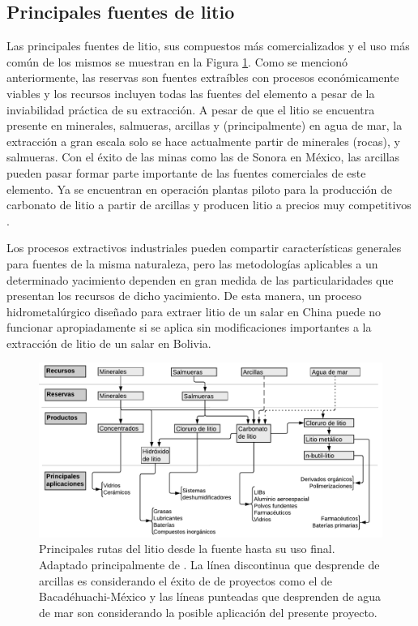 \subsection{Principales fuentes de litio}
Las principales fuentes de litio, sus compuestos más comercializados y el uso más común de los mismos se muestran en la Figura \ref{fig:esquemaSpiers}. Como se mencionó anteriormente, las reservas son fuentes extraíbles con procesos económicamente viables y los recursos incluyen todas las fuentes del elemento a pesar de la inviabilidad práctica de su extracción. A pesar de que el litio se encuentra presente en minerales, salmueras, arcillas y (principalmente) en agua de mar, la extracción a gran escala solo se hace actualmente partir de minerales (rocas), y salmueras. Con el éxito de las minas como las de Sonora en México, las arcillas pueden pasar formar parte importante de las fuentes comerciales de este elemento. Ya se encuentran en operación plantas piloto para la producción de carbonato de litio a partir de arcillas y producen litio a precios muy competitivos \citep{Bacanora2018}.

Los procesos extractivos industriales pueden compartir características generales para fuentes de la misma naturaleza, pero las metodologías aplicables a un determinado yacimiento dependen en gran medida de las particularidades que presentan los recursos de dicho yacimiento. De esta manera, un proceso hidrometalúrgico diseñado para extraer litio de un salar en China puede no funcionar apropiadamente si se aplica sin modificaciones importantes a la extracción de litio de un salar en Bolivia.

{
\begin{figure}[H]
    \centering
    \includegraphics[width=\textwidth]{chap2/images/lithiumsoourcetoeum.pdf}
    \caption[Principales rutas del litio desde la fuente hasta su uso final.]{Principales rutas del litio desde la fuente hasta su uso final. Adaptado principalmente de \citet{SPEIRS2014}. La línea discontinua que desprende de arcillas es considerando el éxito de de proyectos como el de Bacadéhuachi-México y las líneas punteadas que desprenden de agua de mar son considerando la posible aplicación del presente proyecto.}
    \label{fig:esquemaSpiers}
\end{figure}
}

